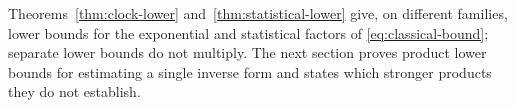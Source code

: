 Theorems~\ref{thm:clock-lower} and~\ref{thm:statistical-lower} give,
on different families, lower bounds for the exponential and statistical
factors of \eqref{eq:classical-bound}; separate lower bounds do not
multiply. The next section proves product lower bounds for estimating a
single inverse form and states which stronger products they do not establish.
